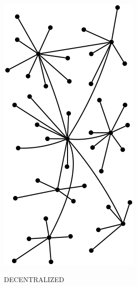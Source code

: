 \documentclass[../HFT-main.tex]{subfiles}
\begin{document}
%

\begin{marginfigure}
  \includegraphics[width=0.6\linewidth]{../figures/Baran-Decentralized.png}
  \caption{DECENTRALIZED}
    \vspace{12pt}
\end{marginfigure}


\end{document}
